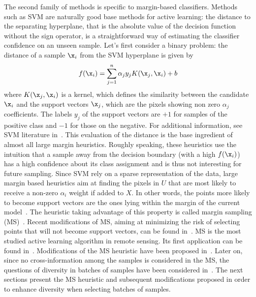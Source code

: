 \label{sec:lm}
The second family of methods is specific to margin-based classifiers. 
Methods such as SVM are naturally good base methods for active learning: the distance to the separating hyperplane, that is the absolute value of the decision function without the sign operator, is a straightforward way of estimating the classifier confidence on an unseen sample. Let's first consider a binary problem: the distance of a sample $\x_i$ from the SVM hyperplane is given by
\begin{equation}
f(\x_i)=\sum_{j=1}^n \alpha_j y_j K(\x_j,\x_i)+b
\label{eq:decfunct}
\end{equation}
where $K(\x_j, \x_i)$ is a kernel, which defines the similarity between the candidate $\x_i$ and the support vectors $\x_j$, which are the pixels showing non zero $\alpha_j$ coefficients. The labels $y_j$ of the support vectors are $+1$ for samples of the positive class and $-1$ for those on the negative. For additional information, see SVM literature in~. 
This evaluation of the distance is the base ingredient of almost all large margin heuristics. Roughly speaking, these heuristics use the intuition that a sample away from the decision boundary (with a high $f(\x_i)$) has a high confidence about its class assignment and is thus not interesting for future sampling.
Since SVM rely on a sparse representation of the data, large margin based heuristics aim at finding the pixels in $U$ that are most likely to receive a non-zero $\alpha_i$ weight if added to $X$. In other words, the points more likely to become support vectors are the ones lying within the margin of the current model~. The heuristic taking advantage of this property is called margin sampling (MS)~. Recent modifications of MS, aiming at minimizing the risk of selecting points that will not become support vectors, can be found in~.
MS is the most studied active learning algorithm in remote sensing. Its first application can be found in~. Modifications of the MS heuristic have been proposed in~. Later on, since no cross-information among the samples is considered in the MS, the questions of diversity in batches of samples have been considered in~. The next sections present the MS heuristic and subsequent modifications proposed in order to enhance diversity when selecting batches of samples.

